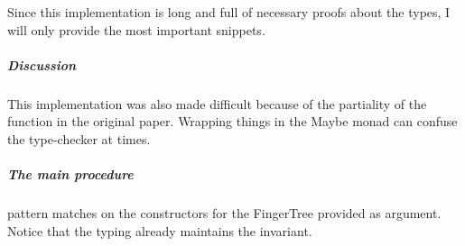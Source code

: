 \documentclass[12pt,twoside,notitlepage]{report}
\begin{document}
Since this implementation is long and full of necessary proofs about the types, I will only provide the most important snippets.

\subparagraph{Discussion} This implementation was also made difficult because of the partiality of the function in the original paper. Wrapping things in the Maybe monad can confuse the type-checker at times.

\subparagraph{The main procedure}pattern matches on the constructors for the FingerTree provided as argument. Notice that the typing already maintains the invariant.

\begin{code}
\\
\>[0]\<[2]%
\>[2] \AgdaSymbol{:}  \AgdaSymbol{\{}\AgdaSymbol{\}} \AgdaSymbol{\{} \AgdaSymbol{:}  \AgdaSymbol{\}} \AgdaSymbol{\{} \AgdaSymbol{:}  \AgdaSymbol{\}}\<%
\\
\>[2]\<[14]%
\>[14]  \AgdaSymbol{:}   \<%
\\
\>[2]\<[14]%
\>[14]  \AgdaSymbol{:}    \<%
\\
\>[2]\<[14]%
\>[14]\AgdaSymbol{\{} \AgdaSymbol{:} \AgdaSymbol{\}} \<%
\\
\>[2]\<[14]%
\>[14] \AgdaSymbol{(} \AgdaSymbol{:}   \AgdaSymbol{)}  \AgdaSymbol{(} \AgdaSymbol{:} \AgdaSymbol{)} \<%
\\
\>[2]\<[14]%
\>[14] \AgdaSymbol{(} \AgdaSymbol{:}    \AgdaSymbol{\{}\AgdaSymbol{\})} \<%
\\
\>[2]\<[14]%
\>[14]  \AgdaSymbol{(}   \AgdaSymbol{\{}\AgdaSymbol{\})}\<%
\\
\>[0]\<[2]%
\>[2]   \<%

\end{code}
\end{document}
